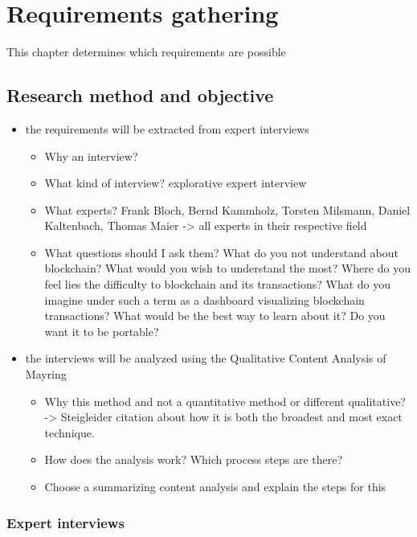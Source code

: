 \chapter{Requirements gathering} \label{chap:ReqEng}

This chapter determines which requirements are possible 
\section{Research method and objective}


\begin{itemize}
    \item the requirements will be extracted from expert interviews
    \begin{itemize}
        \item Why an interview?
        \item What kind of interview? explorative expert interview
        \item What experts? Frank Bloch, Bernd Kammholz, Torsten Milsmann, Daniel Kaltenbach, Thomas Maier -> all experts in their respective field
        \item What questions should I ask them? What do you not understand about blockchain? What would you wish to understand the most? Where do you feel lies the difficulty to blockchain and its transactions? What do you imagine under such a term as a dashboard visualizing blockchain transactions? What would be the best way to learn about it? Do you want it to be portable?
    \end{itemize}
    \item the interviews will be analyzed using the Qualitative Content Analysis of Mayring
    \begin{itemize}
        \item Why this method and not a quantitative method or different qualitative? -> Steigleider citation about how it is both the broadest and most exact technique. 
        \item How does the analysis work? Which process steps are there?
        \item Choose a summarizing content analysis and explain the steps for this
    \end{itemize}
\end{itemize}

\subsection{Expert interviews}


